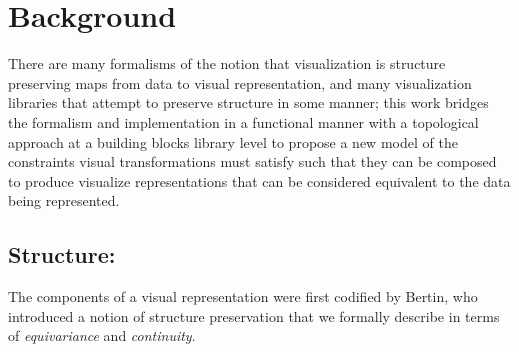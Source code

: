 \documentclass[../main.tex]{subfiles}
\begin{document}
\section{Background}
There are many formalisms of the notion that visualization is structure preserving maps from data to visual representation, and many visualization libraries that attempt to preserve structure in some manner; this work bridges the formalism and implementation in a functional manner with a topological approach at a building blocks library level to propose a new model of the constraints visual transformations must satisfy such that they can be composed to produce visualize representations that can be considered equivalent to the data being represented.

\subsection{Structure:}
\label{sec:intro:structure}
 The components of a visual representation were first codified by Bertin\cite{bertinSemiologyGraphicsDiagrams2011a}, who introduced a notion of structure preservation that we formally describe in terms of \textit{equivariance} and \textit{continuity}. 
 
\end{document}
